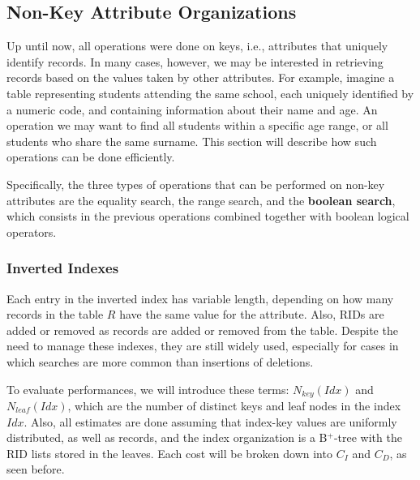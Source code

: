 \subsection{Non-Key Attribute Organizations}

Up until now, all operations were done on keys, i.e., attributes that uniquely identify records. In many cases, however, we may be interested in retrieving records based on the values taken by other attributes. For example, imagine a table representing students attending the same school, each uniquely identified by a numeric code, and containing information about their name and age. An operation we may want to find all students within a specific age range, or all students who share the same surname. This section will describe how such operations can be done efficiently.

Specifically, the three types of operations that can be performed on non-key attributes are the equality search, the range search, and the \textbf{boolean search}, which consists in the previous operations combined together with boolean logical operators.


\subsubsection{Inverted Indexes}


Each entry in the inverted index has variable length, depending on how many records in the table $R$ have the same value for the attribute. Also, RIDs are added or removed as records are added or removed from the table. Despite the need to manage these indexes, they are still widely used, especially for cases in which searches are more common than insertions of deletions.

To evaluate performances, we will introduce these terms: $N_{key}(Idx)$ and $N_{leaf}(Idx)$, which are the number of distinct keys and leaf nodes in the index $Idx$. Also, all estimates are done assuming that index-key values are uniformly distributed, as well as records, and the index organization is a B$^+$-tree with the RID lists stored in the leaves. Each cost will be broken down into $C_I$ and $C_D$, as seen before.


